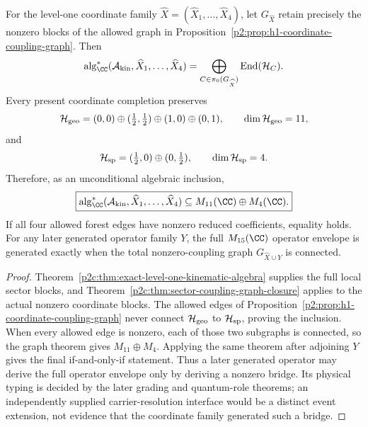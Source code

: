 \documentclass[12pt,a4paper]{article}
\begin{document}
\begin{corollary}
\label{p2c:cor:present-coordinate-envelope-condition}
For the level-one coordinate family
\(\widehat X=(\widehat X_1,\ldots,\widehat X_4)\), let
\(G_{\widehat X}\) retain precisely the nonzero blocks of the allowed graph in
Proposition~\ref{p2:prop:h1-coordinate-coupling-graph}.  Then
\[
 \operatorname{alg}_{\CC}^{*}
 (\mathcal A_{\rm kin},\widehat X_1,\ldots,\widehat X_4)
 =\bigoplus_{C\in\pi_0(G_{\widehat X})}
   \operatorname{End}(\mathcal H_C).
\]
Every present coordinate completion preserves
\[
 \mathcal H_{\rm geo}
 =(0,0)\oplus(\tfrac12,\tfrac12)\oplus(1,0)\oplus(0,1),
 \qquad \dim\mathcal H_{\rm geo}=11,
\]
and
\[
 \mathcal H_{\rm sp}
 =(\tfrac12,0)\oplus(0,\tfrac12),
 \qquad \dim\mathcal H_{\rm sp}=4.
\]
Therefore, as an unconditional algebraic inclusion,
\[
 \boxed{
 \operatorname{alg}_{\CC}^{*}
 (\mathcal A_{\rm kin},\widehat X_1,\ldots,\widehat X_4)
 \subseteq M_{11}(\CC)\oplus M_4(\CC).}
\]
If all four allowed forest edges have nonzero reduced coefficients, equality
holds.  For any later generated operator family \(Y\), the full
\(M_{15}(\CC)\) operator envelope is generated exactly when the total nonzero-coupling
graph \(G_{\widehat X\cup Y}\) is connected.
\end{corollary}

\begin{proof}
Theorem~\ref{p2c:thm:exact-level-one-kinematic-algebra} supplies the full local
sector blocks, and Theorem~\ref{p2c:thm:sector-coupling-graph-closure} applies
to the actual nonzero coordinate blocks.  The allowed edges of
Proposition~\ref{p2:prop:h1-coordinate-coupling-graph} never connect
\(\mathcal H_{\rm geo}\) to \(\mathcal H_{\rm sp}\), proving the inclusion.
When every allowed edge is nonzero, each of those two subgraphs is connected,
so the graph theorem gives \(M_{11}\oplus M_4\).  Applying the same theorem
after adjoining \(Y\) gives the final if-and-only-if statement.  Thus a later
generated operator may derive the full operator envelope only by deriving a
nonzero bridge.  Its physical typing is decided by the later grading and
quantum-role theorems; an independently supplied carrier-resolution interface
would be a distinct event extension, not evidence that the coordinate family
generated such a bridge.
\end{proof}
\end{document}
